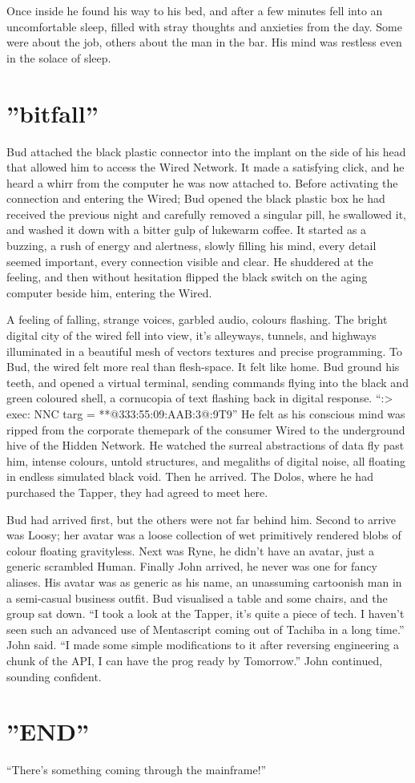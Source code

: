 \documentclass{book}
\begin{document}
Once inside he found his way to his bed, and after a few minutes fell into an uncomfortable sleep, filled with stray thoughts and anxieties from the day. Some were about the job, others about the man in the bar. His mind was restless even in the solace of sleep.

\chapter{''bitfall''}
Bud attached the black plastic connector into the implant on the side of his head that allowed him to access the Wired Network. It made a satisfying click, and he heard a whirr from the computer he was now attached to. Before activating the connection and entering the Wired; Bud opened the black plastic box he had received the previous night and carefully removed a singular pill, he swallowed it, and washed it down with a bitter gulp of lukewarm coffee. It started as a buzzing, a rush of energy and alertness, slowly filling his mind, every detail seemed important, every connection visible and clear. He shuddered at the feeling, and then without hesitation flipped the black switch on the aging computer beside him, entering the Wired.

A feeling of falling, strange voices, garbled audio, colours flashing. The bright digital city of the wired fell into view, it's alleyways, tunnels, and highways illuminated in a beautiful mesh of vectors textures and precise programming. To Bud, the wired felt more real than flesh-space. It felt like home. Bud ground his teeth, and opened a virtual terminal, sending commands flying into the black and green coloured shell, a cornucopia of text flashing back in digital response. ``:> exec: NNC targ = **@333:55:09:AAB:3@:9T9'' He felt as his conscious mind was ripped from the corporate themepark of the consumer Wired to the underground hive of the Hidden Network. He watched the surreal abstractions of data fly past him, intense colours, untold structures, and megaliths of digital noise, all floating in endless simulated black void. Then he arrived. The Dolos, where he had purchased the Tapper, they had agreed to meet here.

Bud had arrived first, but the others were not far behind him. Second to arrive was Loosy; her avatar was a loose collection of wet primitively rendered blobs of colour floating gravityless. Next was Ryne, he didn't have an avatar, just a generic scrambled Human. Finally John arrived, he never was one for fancy aliases. His avatar was as generic as his name, an unassuming cartoonish man in a semi-casual business outfit. Bud visualised a table and some chairs, and the group sat down. ``I took a look at the Tapper, it's quite a piece of tech. I haven't seen such an advanced use of Mentascript coming out of Tachiba in a long time.'' John said. ``I made some simple modifications to it after reversing engineering a chunk of the API, I can have the prog ready by Tomorrow.'' John continued, sounding confident.

\chapter{''END''}
``There's something coming through the mainframe!''
\end{document}
